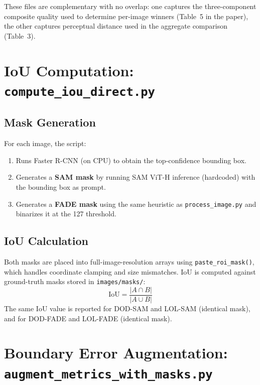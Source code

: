 \documentclass[11pt,a4paper]{article}
\begin{document}
These files are complementary with no overlap: one captures the three-component composite quality used to determine per-image winners (Table~5 in the paper), the other captures perceptual distance used in the aggregate comparison (Table~3).

\section{IoU Computation: \texttt{compute\_iou\_direct.py}}

\subsection{Mask Generation}

For each image, the script:
\begin{enumerate}
  \item Runs Faster R-CNN (on CPU) to obtain the top-confidence bounding box.
  \item Generates a \textbf{SAM mask} by running SAM ViT-H inference (hardcoded) with the bounding box as prompt.
  \item Generates a \textbf{FADE mask} using the same heuristic as \texttt{process\_image.py} and binarizes it at the 127 threshold.
\end{enumerate}

\subsection{IoU Calculation}

Both masks are placed into full-image-resolution arrays using \texttt{paste\_roi\_mask()}, which handles coordinate clamping and size mismatches. IoU is computed against ground-truth masks stored in \texttt{images/masks/}:
\begin{equation}
  \text{IoU} = \frac{|A \cap B|}{|A \cup B|}
\end{equation}
The same IoU value is reported for DOD-SAM and LOL-SAM (identical mask), and for DOD-FADE and LOL-FADE (identical mask).

\section{Boundary Error Augmentation: \texttt{augment\_metrics\_with\_masks.py}}
\end{document}
